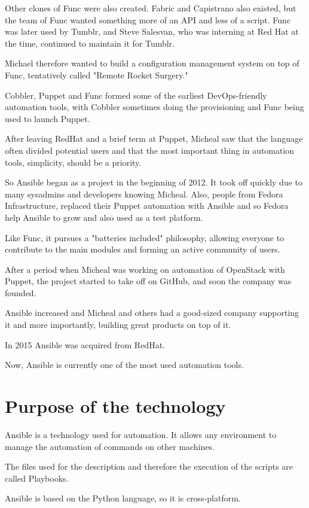 \documentclass[12pt,a4paper,openright,twoside]{book}
\begin{document}
Other clones of Func were also created. Fabric and Capistrano also existed, but the team of Func wanted something more of an API and less of a script. Func was later used by Tumblr, and Steve Salesvan, who was interning at Red Hat at the time, continued to maintain it for Tumblr.


Michael therefore wanted to build a configuration management system on top of Func, tentatively called "Remote Rocket Surgery."


Cobbler, Puppet and Func formed some of the earliest DevOps-friendly automation tools, with Cobbler sometimes doing the provisioning and Func being used to launch Puppet.


After leaving RedHat and a brief term at Puppet, Micheal saw that the language often divided potential users and that the most important thing in automation tools, simplicity, should be a priority.


So Ansible began as a project in the beginning of 2012. It took off quickly due to many sysadmins and developers knowing Micheal.
Also, people from Fedora Infrastructure, replaced their Puppet automation with Ansible and so Fedora help Ansible to grow and also used as a test platform.


Like Func, it pursues a "batteries included" philosophy, allowing everyone to contribute to the main modules and forming an active community of users.


After a period when Micheal was working on automation of OpenStack with Puppet, the project started to take off on GitHub, and soon the company was founded.


Ansible increased and Micheal and others had a good-sized company supporting it and more importantly, building great products on top of it.


In 2015 Ansible was acquired from RedHat\cite{ansibleRedHat}.


Now, Ansible is currently one of the most used automation tools.

\section{Purpose of the technology}
Ansible is a technology used for automation. It allows any environment to manage the automation of commands on other machines.


The files used for the description and therefore the execution of the scripts are called Playbooks.


Ansible is based on the Python language, so it is cross-platform.
\end{document}
